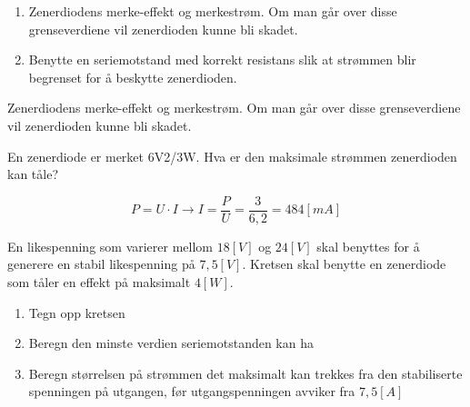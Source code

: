 \begin{solution}[name=Løsningsforslag oppgave]
\begin{enumerate}[label=\roman*)]
	\item Zenerdiodens merke-effekt og merkestrøm. Om man går over disse grenseverdiene vil zenerdioden kunne bli skadet.
	\item Benytte en seriemotstand med korrekt resistans slik at strømmen blir begrenset for å beskytte zenerdioden.
\end{enumerate}

Zenerdiodens merke-effekt og merkestrøm. Om man går over disse grenseverdiene vil zenerdioden kunne bli skadet.
\end{solution}


\begin{question}[name=Oppgave, topic=zenerdioder]
En zenerdiode er merket 6V2/3W. Hva er den maksimale strømmen zenerdioden kan tåle?
\end{question}

\vspace{0.5cm} %

\begin{solution}[name=Løsningsforslag oppgave]
\[P=U\cdot I\rightarrow I=\frac{P}{U}=\frac{3}{6,2}=484 [mA]\]

\end{solution}



\begin{question}[name=Oppgave, topic=zenerdioder]
En likespenning som varierer mellom $18 [V]$ og $24 [V]$ skal benyttes for å generere en stabil likespenning på $7,5 [V]$. Kretsen skal benytte en zenerdiode som tåler en effekt på maksimalt $4 [W]$.

\begin{enumerate}[label=\roman*)]
	\item Tegn opp kretsen
	\item Beregn den minste verdien seriemotstanden kan ha
	\item Beregn størrelsen på strømmen det maksimalt kan trekkes fra den stabiliserte spenningen på utgangen, før utgangspenningen avviker fra $7,5 [A]$
\end{enumerate}
\end{question}

\vspace{0.5cm} %

